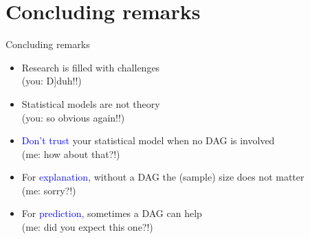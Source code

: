 \section{Concluding remarks}
%
\begin{frame}[negative]
	\sectionpage
\end{frame}
%
%
\begin{lhframe}[rhgraphic={\texttt{[image: think.jpg]}}]
	{Concluding remarks}
	
	\begin{itemize}
		\item Research is filled with challenges \\
		{\small (you: D]duh!!) }
		\item Statistical models are not theory \\
		{\small (you: so obvious again!!) }
		\item \textcolor{blue}{Don't trust} your statistical model when no DAG is involved \\
		{\small (me: how about that?!) }
		\item For \textcolor{blue}{explanation}, without a DAG the (sample) size does not matter \\
		{\small (me: sorry?!) }
		\item For \textcolor{blue}{prediction}, sometimes a DAG can help \\
		{\small (me: did you expect this one?!)}
	\end{itemize} 
\end{lhframe}
%
%